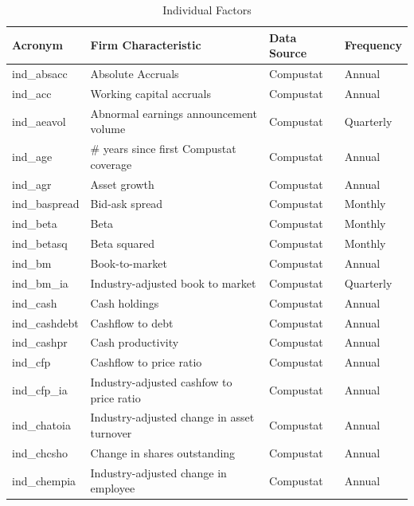 \documentclass{article}
\begin{document}
	\begin{center}
		\fontsize{6}{8}\selectfont
		\label{ind_factors}
		\begin{longtable}{llll}
			\caption{Individual Factors} \\ \hline
			Acronym & Firm Characteristic & Data Source & Frequency \\ \hline
			ind\_absacc\footnotemark[\value{footnote}] & Absolute Accruals & Compustat & Annual \\
			ind\_acc\footnotemark[\value{footnote}] & Working capital accruals & Compustat & Annual \\
			ind\_aeavol & Abnormal earnings announcement volume & Compustat & Quarterly \\
			ind\_age & \# years since first Compustat coverage  & Compustat & Annual \\
			ind\_agr & Asset growth & Compustat & Annual \\
			ind\_baspread & Bid-ask spread & Compustat & Monthly \\
			ind\_beta & Beta & Compustat & Monthly \\
			ind\_betasq & Beta squared & Compustat & Monthly \\
			ind\_bm & Book-to-market & Compustat & Annual \\
			ind\_bm\_ia & Industry-adjusted book to market & Compustat & Quarterly \\
			ind\_cash & Cash holdings & Compustat & Annual \\
			ind\_cashdebt & Cashflow to debt & Compustat & Annual \\
			ind\_cashpr & Cash productivity & Compustat & Annual \\
			ind\_cfp\footnotemark[\value{footnote}] & Cashflow to price ratio & Compustat & Annual \\
			ind\_cfp\_ia\footnotemark[\value{footnote}] & Industry-adjusted cashfow to price ratio & Compustat & Annual \\
			ind\_chatoia\footnotemark[\value{footnote}] & Industry-adjusted change in asset turnover & Compustat & Annual \\
			ind\_chcsho & Change in shares outstanding & Compustat & Annual \\
			ind\_chempia & Industry-adjusted change in employee & Compustat & Annual \\

\end{longtable}
\end{center}
\end{document}
